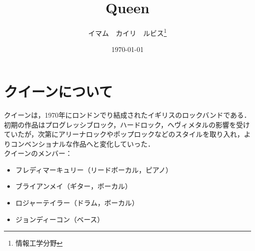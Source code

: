 \documentclass[a4j, twocolumn]{jarticle}
\begin{document}
\title{Queen}
\author{イマム　カイリ　ルビス\thanks{情報工学分野}}
\date{\today}

\maketitle

\section{クイーンについて}
クイーンは，1970年にロンドンでり結成されたイギリスのロックバンドである．初期の作品はプログレッシブロック，ハードロック，ヘヴィメタルの影響を受けていたが，次第にアリーナロックやポップロックなどのスタイルを取り入れ，よりコンベンショナルな作品へと変化していった．\\
クイーンのメンバー：
\begin{itemize}
  \item フレディマーキュリー（リードボーカル，ピアノ）
  \item ブライアンメイ（ギター，ボーカル）
  \item ロジャーテイラー（ドラム，ボーカル）
  \item ジョンディーコン（ベース）
\end{itemize}
\end{document}
